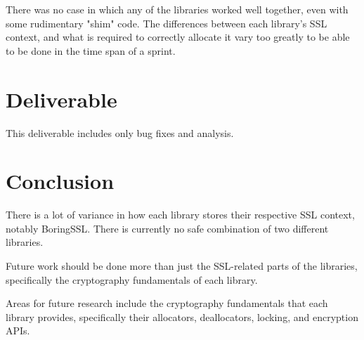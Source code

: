 \documentclass{acm_proc_article-sp}
\begin{document}
There was no case in which any of the libraries worked well together, even with
some rudimentary "shim" code. The differences between each library's SSL
context, and what is required to correctly allocate it vary too greatly to be
able to be done in the time span of a sprint.

\section{Deliverable}\label{Sec:Deliv}

This deliverable includes only bug fixes and analysis.

\section{Conclusion}

There is a lot of variance in how each library stores their respective SSL
context, notably BoringSSL. There is currently no safe combination of two
different libraries.

Future work should be done more than just the SSL-related parts of the
libraries, specifically the cryptography fundamentals of each library.

Areas for future research include the cryptography fundamentals that each
library provides, specifically their allocators, deallocators, locking, and
encryption APIs.



\balancecolumns
\end{document}
